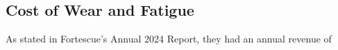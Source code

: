 \subsection{Cost of Wear and Fatigue}
As stated in Fortescue’s Annual 2024 Report, they had an annual revenue of 